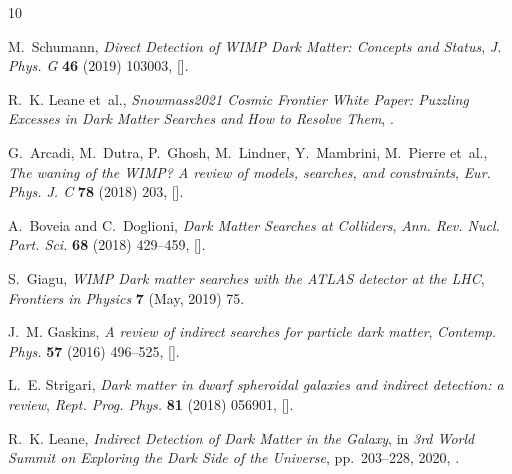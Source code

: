 \documentclass[11pt]{article}
\begin{document}
\providecommand{\href}[2]{#2}\begingroup\raggedright\begin{thebibliography}{10}

M.~Schumann, \emph{{Direct Detection of WIMP Dark Matter: Concepts and
  Status}}, \href{https://doi.org/10.1088/1361-6471/ab2ea5}{\emph{J. Phys. G}
  {\bfseries 46} (2019) 103003},
  [\href{https://arxiv.org/abs/1903.03026}{{}}].

R.~K. Leane et~al., \emph{{Snowmass2021 Cosmic Frontier White Paper: Puzzling
  Excesses in Dark Matter Searches and How to Resolve Them}},
  \href{https://arxiv.org/abs/2203.06859}{{}}.

G.~Arcadi, M.~Dutra, P.~Ghosh, M.~Lindner, Y.~Mambrini, M.~Pierre et~al.,
  \emph{{The waning of the WIMP? A review of models, searches, and
  constraints}},
  \href{https://doi.org/10.1140/epjc/s10052-018-5662-y}{\emph{Eur. Phys. J. C}
  {\bfseries 78} (2018) 203},
  [\href{https://arxiv.org/abs/1703.07364}{{}}].

A.~Boveia and C.~Doglioni, \emph{{Dark Matter Searches at Colliders}},
  \href{https://doi.org/10.1146/annurev-nucl-101917-021008}{\emph{Ann. Rev.
  Nucl. Part. Sci.} {\bfseries 68} (2018) 429--459},
  [\href{https://arxiv.org/abs/1810.12238}{{}}].

S.~{Giagu}, \emph{{WIMP Dark matter searches with the ATLAS detector at the
  LHC}}, \href{https://doi.org/10.3389/fphy.2019.00075}{\emph{Frontiers in
  Physics} {\bfseries 7} (May, 2019) 75}.

J.~M. Gaskins, \emph{{A review of indirect searches for particle dark matter}},
  \href{https://doi.org/10.1080/00107514.2016.1175160}{\emph{Contemp. Phys.}
  {\bfseries 57} (2016) 496--525},
  [\href{https://arxiv.org/abs/1604.00014}{{}}].

L.~E. Strigari, \emph{{Dark matter in dwarf spheroidal galaxies and indirect
  detection: a review}},
  \href{https://doi.org/10.1088/1361-6633/aaae16}{\emph{Rept. Prog. Phys.}
  {\bfseries 81} (2018) 056901},
  [\href{https://arxiv.org/abs/1805.05883}{{}}].

R.~K. Leane, \emph{{Indirect Detection of Dark Matter in the Galaxy}},  in
  \emph{{3rd World Summit on Exploring the Dark Side of the Universe}},
  pp.~203--228, 2020, \href{https://arxiv.org/abs/2006.00513}{{}}.


\end{thebibliography}
\end{document}
